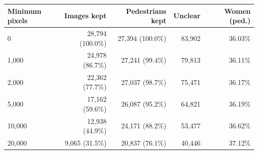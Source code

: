 \begin{tabular}{@{}lrrrr@{}}
\toprule
Minimum pixels & Images kept & Pedestrians kept & Unclear & Women (ped.) \\
\midrule
0 & 28,794 (100.0\%) & 27,394 (100.0\%) & 83,902 & 36.03\% \\
1,000 & 24,978 (86.7\%) & 27,241 (99.4\%) & 79,813 & 36.11\% \\
2,000 & 22,362 (77.7\%) & 27,037 (98.7\%) & 75,471 & 36.17\% \\
5,000 & 17,162 (59.6\%) & 26,087 (95.2\%) & 64,821 & 36.19\% \\
10,000 & 12,938 (44.9\%) & 24,171 (88.2\%) & 53,477 & 36.62\% \\
20,000 & 9,065 (31.5\%) & 20,837 (76.1\%) & 40,446 & 37.12\% \\
\bottomrule
\end{tabular}
